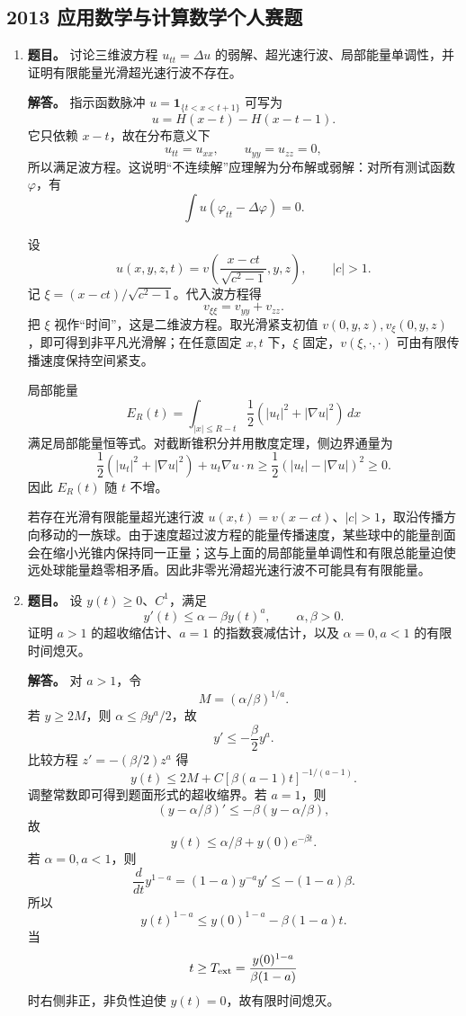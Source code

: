 ﻿\documentclass[UTF8,12pt]{ctexart}
\begin{document}
\subsection{2013 应用数学与计算数学个人赛题}
\begin{enumerate}[label=\textbf{\arabic*.},leftmargin=2.2em]
\item \textbf{题目。} 讨论三维波方程 \(u_{tt}=\Delta u\) 的弱解、超光速行波、局部能量单调性，并证明有限能量光滑超光速行波不存在。

\textbf{解答。} 指示函数脉冲 \(u=\mathbf 1_{\{t<x<t+1\}}\) 可写为
\[
u=H(x-t)-H(x-t-1).
\]
它只依赖 \(x-t\)，故在分布意义下
\[
u_{tt}=u_{xx},\qquad u_{yy}=u_{zz}=0,
\]
所以满足波方程。这说明“不连续解”应理解为分布解或弱解：对所有测试函数 \(\varphi\)，有
\[
\int u(\varphi_{tt}-\Delta\varphi)=0.
\]

设
\[
u(x,y,z,t)=v\!\left(\frac{x-ct}{\sqrt{c^2-1}},y,z\right),\qquad |c|>1.
\]
记 \(\xi=(x-ct)/\sqrt{c^2-1}\)。代入波方程得
\[
v_{\xi\xi}=v_{yy}+v_{zz}.
\]
把 \(\xi\) 视作“时间”，这是二维波方程。取光滑紧支初值 \(v(0,y,z),v_\xi(0,y,z)\)，即可得到非平凡光滑解；在任意固定 \(x,t\) 下，\(\xi\) 固定，\(v(\xi,\cdot,\cdot)\) 可由有限传播速度保持空间紧支。

局部能量
\[
E_R(t)=\int_{|x|\le R-t}\frac12(|u_t|^2+|\nabla u|^2)\,dx
\]
满足局部能量恒等式。对截断锥积分并用散度定理，侧边界通量为
\[
\frac12(|u_t|^2+|\nabla u|^2)+u_t\nabla u\cdot n
\ge \frac12(|u_t|-|\nabla u|)^2\ge0.
\]
因此 \(E_R(t)\) 随 \(t\) 不增。

若存在光滑有限能量超光速行波 \(u(x,t)=v(x-ct)\)、\(|c|>1\)，取沿传播方向移动的一族球。由于速度超过波方程的能量传播速度，某些球中的能量剖面会在缩小光锥内保持同一正量；这与上面的局部能量单调性和有限总能量迫使远处球能量趋零相矛盾。因此非零光滑超光速行波不可能具有有限能量。

\item \textbf{题目。} 设 \(y(t)\ge0\)、\(C^1\)，满足
\[
y'(t)\le \alpha-\beta y(t)^a,\qquad \alpha,\beta>0.
\]
证明 \(a>1\) 的超收缩估计、\(a=1\) 的指数衰减估计，以及 \(\alpha=0,a<1\) 的有限时间熄灭。

\textbf{解答。} 对 \(a>1\)，令
\[
M=(\alpha/\beta)^{1/a}.
\]
若 \(y\ge 2M\)，则 \(\alpha\le \beta y^a/2\)，故
\[
y'\le -\frac{\beta}{2}y^a.
\]
比较方程 \(z'=-(\beta/2)z^a\) 得
\[
y(t)\le 2M+C[\beta(a-1)t]^{-1/(a-1)}.
\]
调整常数即可得到题面形式的超收缩界。若 \(a=1\)，则
\[
(y-\alpha/\beta)'\le-\beta(y-\alpha/\beta),
\]
故
\[
y(t)\le \alpha/\beta+y(0)e^{-\beta t}.
\]
若 \(\alpha=0,a<1\)，则
\[
\frac d{dt}y^{1-a}=(1-a)y^{-a}y'\le-(1-a)\beta.
\]
所以
\[
y(t)^{1-a}\le y(0)^{1-a}-\beta(1-a)t.
\]
当
\[
t\ge T_{\rm ext}=\frac{y(0)^{1-a}}{\beta(1-a)}
\]
时右侧非正，非负性迫使 \(y(t)=0\)，故有限时间熄灭。


\end{enumerate}
\end{document}
